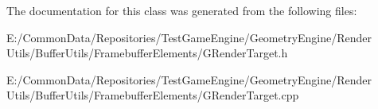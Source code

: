 The documentation for this class was generated from the following files\+:\begin{DoxyCompactItemize}
\item 
E\+:/\+Common\+Data/\+Repositories/\+Test\+Game\+Engine/\+Geometry\+Engine/\+Render Utils/\+Buffer\+Utils/\+Framebuffer\+Elements/G\+Render\+Target.\+h\item 
E\+:/\+Common\+Data/\+Repositories/\+Test\+Game\+Engine/\+Geometry\+Engine/\+Render Utils/\+Buffer\+Utils/\+Framebuffer\+Elements/G\+Render\+Target.\+cpp\end{DoxyCompactItemize}
